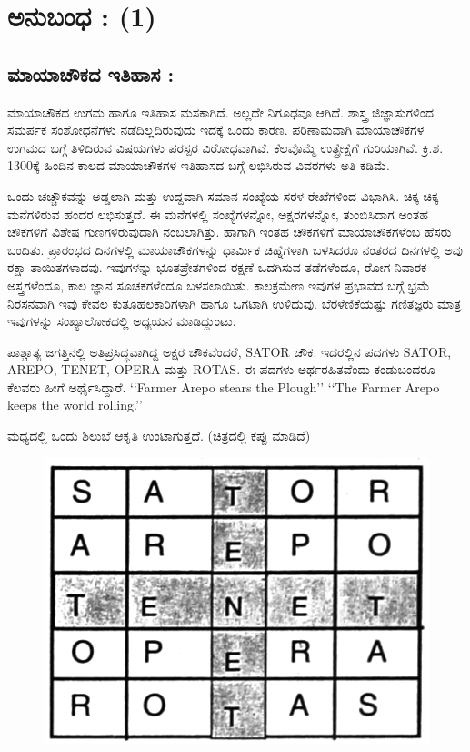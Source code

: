 \chapter{ಅನುಬಂಧ : (1)}

\section*{ಮಾಯಾಚೌಕದ ಇತಿಹಾಸ :}

ಮಾಯಾಚೌಕದ ಉಗಮ ಹಾಗೂ ಇತಿಹಾಸ ಮಸಕಾಗಿದೆ. ಅಲ್ಲದೇ ನಿಗೂಢವೂ ಆಗಿದೆ. ಶಾಸ್ತ್ರ ಜಿಜ್ಞಾಸುಗಳಿಂದ ಸಮರ್ಪಕ ಸಂಶೋಧನೆಗಳು ನಡೆದಿಲ್ಲದಿರುವುದು ಇದಕ್ಕೆ ಒಂದು ಕಾರಣ. ಪರಿಣಾಮವಾಗಿ ಮಾಯಾಚೌಕಗಳ ಉಗಮದ ಬಗ್ಗೆ ತಿಳಿದಿರುವ ವಿಷಯಗಳು ಪರಸ್ಪರ ವಿರೋಧವಾಗಿವೆ. ಕೆಲವೊಮ್ಮೆ ಉತ್ಪ್ರೇಕ್ಷೆಗೆ ಗುರಿಯಾಗಿವೆ. ಕ್ರಿ.ಶ. 1300ಕ್ಕೆ ಹಿಂದಿನ ಕಾಲದ ಮಾಯಾಚೌಕಗಳ ಇತಿಹಾಸದ ಬಗ್ಗೆ ಲಭಿಸಿರುವ ವಿವರಗಳು ಅತಿ ಕಡಿಮೆ.

ಒಂದು ಚಚ್ಚೌಕವನ್ನು ಅಡ್ಡಲಾಗಿ ಮತ್ತು ಉದ್ದವಾಗಿ ಸಮಾನ ಸಂಖ್ಯೆಯ ಸರಳ ರೇಖೆಗಳಿಂದ ವಿಭಾಗಿಸಿ. ಚಿಕ್ಕ ಚಿಕ್ಕ ಮನೆಗಳಿರುವ ಹಂದರ ಲಭಿಸುತ್ತದೆ. ಈ ಮನೆಗಳಲ್ಲಿ ಸಂಖ್ಯೆಗಳನ್ನೋ, ಅಕ್ಷರಗಳನ್ನೋ, ತುಂಬಿಸಿದಾಗ ಅಂತಹ ಚೌಕಗಳಿಗೆ ವಿಶೇಷ ಗುಣಗಳಿರುವುದಾಗಿ ನಂಬಲಾಗಿತ್ತು. ಹಾಗಾಗಿ ಇಂತಹ ಚೌಕಗಳಿಗೆ ಮಾಯಾಚೌಕಗಳೆಂಬ ಹೆಸರು ಬಂದಿತು. ಪ್ರಾರಂಭದ ದಿನಗಳಲ್ಲಿ ಮಾಯಾಚೌಕಗಳನ್ನು ಧಾರ್ಮಿಕ ಚಿಹ್ನೆಗಳಾಗಿ ಬಳಸಿದರೂ ನಂತರದ ದಿನಗಳಲ್ಲಿ ಅವು ರಕ್ಷಾ ತಾಯಿತಗಳಾದವು. ಇವುಗಳನ್ನು ಭೂತಪ್ರೇತಗಳಿಂದ ರಕ್ಷಣೆ ಒದಗಿಸುವ ತಡೆಗಳೆಂದೂ, ರೋಗ ನಿವಾರಕ ಅಸ್ತ್ರಗಳೆಂದೂ, ಕಾಲ ಜ್ಞಾನ ಸೂಚಕಗಳೆಂದೂ ಬಳಸಲಾಯಿತು. ಕಾಲಕ್ರಮೇಣ ಇವುಗಳ ಪ್ರಭಾವದ ಬಗ್ಗೆ ಭ್ರಮೆ ನಿರಸನವಾಗಿ ಇವು ಕೇವಲ ಕುತೂಹಲಕಾರಿಗಳಾಗಿ ಹಾಗೂ ಒಗಟಾಗಿ ಉಳಿದುವು. ಬೆರಳೆಣಿಕೆಯಷ್ಟು ಗಣಿತಜ್ಞರು ಮಾತ್ರ ಇವುಗಳನ್ನು ಸಂಖ್ಯಾಲೋಕದಲ್ಲಿ ಅಧ್ಯಯನ ಮಾಡಿದ್ದುಂಟು.

ಪಾಶ್ಚಾತ್ಯ ಜಗತ್ತಿನಲ್ಲಿ ಅತಿಪ್ರಸಿದ್ಧವಾಗಿದ್ದ ಅಕ್ಷರ ಚೌಕವೆಂದರೆ, SATOR ಚೌಕ. ಇದರಲ್ಲಿನ ಪದಗಳು SATOR, AREPO, TENET, OPERA ಮತ್ತು ROTAS. ಈ ಪದಗಳು ಅರ್ಥರಹಿತವೆಂದು ಕಂಡುಬಂದರೂ ಕೆಲವರು ಹೀಗೆ ಅರ್ಥೈಸಿದ್ದಾರೆ. ‘‘Farmer Arepo stears the Plough’’ ‘‘The Farmer Arepo keeps the world rolling.’’

ಮಧ್ಯದಲ್ಲಿ ಒಂದು ಶಿಲುಬೆ ಆಕೃತಿ ಉಂಟಾಗುತ್ತದೆ. (ಚಿತ್ರದಲ್ಲಿ ಕಪ್ಪು ಮಾಡಿದೆ)
\begin{figure}[H]
\includegraphics{src/figures/chap9/fig9.1.jpg}
\end{figure}

